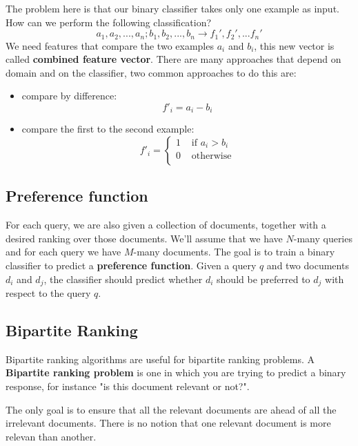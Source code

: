 The problem here is that our binary classifier takes only one example as input. How can we perform the following classification?
\begin{equation}
    a_1, a_2, ..., a_n; b_1, b_2, ..., b_n \to f_1', f_2', ... f_n'
\end{equation}
We need features that compare the two examples \(a_i\) and \(b_i\), this new vector is called \textbf{combined feature vector}. There are many approaches that depend on domain and on the classifier, two common approaches to do this are:
\begin{itemize}
    \item compare by difference:
    \begin{equation*}
        f'_i = a_i - b_i
    \end{equation*}
    \item compare the first to the second example:
    \begin{equation*}
        f'_i = \begin{cases}
            1 &\text{ if } a_i > b_i\\
            0 &\text{ otherwise}\\
        \end{cases}
    \end{equation*}
\end{itemize}

\subsection{Preference function}
For each query, we are also given a collection of documents, together with a desired ranking over those documents. We'll assume that we have \(N\)-many queries and for each query we have \(M\)-many documents. The goal is to train a binary classifier to predict a \textbf{preference function}. Given a query \(q\) and two documents \(d_i\) and \(d_j\), the classifier should predict whether \(d_i\) should be preferred to \(d_j\) with respect to the query \(q\).

\subsection{Bipartite Ranking}
Bipartite ranking algorithms are useful for bipartite ranking problems. A \textbf{Bipartite ranking problem} is one in which you are trying to predict a binary response, for instance "is this document relevant or not?".

The only goal is to ensure that all the relevant documents are ahead of all the irrelevant documents. There is no notion that one relevant document is more relevan than another.

